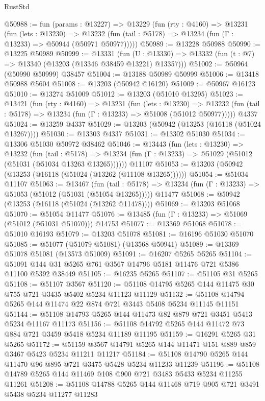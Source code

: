 \begin{lexlean}{RustStd}
\begin{coremodule}
@50988 := fun (params : @13227) =>
  @13229
    (fun (rty : @4160) =>
    @13231
      (fun (lets : @13230) =>
      @13232 (fun (tail : @5178) => @13234 (fun (Γ : @13233) => @50944 (@50971 @50977)))))
@50989 := @13228 @50988
@50990 := @13225 @50989
@50999 := @13331
    (fun (U : @13330) => @13332 (fun (t : @7) => @13340 (@13203 (@13346 @38459 @13221) @13357)))
@51002 := @50964 (@50990 @50999) @38457
@51004 := @13188 @50989 @50999
@51006 := @13418 @50988 @5604
@51008 := @13203 (@50942 @16120)
@51009 := @50967 @16123
@51010 := @13274 @51009
@51012 := @13203 (@51010 @13295)
@51023 := @13421
    (fun (rty : @4160) =>
    @13231
      (fun (lets : @13230) =>
      @13232 (fun (tail : @5178) => @13234 (fun (Γ : @13233) => @51008 (@51012 @50977)))))
    @4337
@51024 := @13259 @4337
@51029 := @13203 (@50942 (@13253 (@16118 (@51024 @13267))))
@51030 := @13303 @4337
@51031 := @13302 @51030
@51034 := @13306 @51030 @50972 @38462
@51046 := @13443
    (fun (lets : @13230) =>
    @13232
      (fun (tail : @5178) =>
      @13234 (fun (Γ : @13233) => @51029 (@51012 (@51031 (@51034 @13263 @13265))))))
    @11107
@51053 := @13203 (@50942 (@13253 (@16118 (@51024 (@13262 (@11108 @13265))))))
@51054 := @51034 @11107
@51063 := @13467
    (fun (tail : @5178) => @13234 (fun (Γ : @13233) => @51053 (@51012 (@51031 (@51054 @13265)))))
    @11477
@51068 := @50942 (@13253 (@16118 (@51024 (@13262 @11478))))
@51069 := @13203 @51068
@51070 := @51054 @11477
@51076 := @13485 (fun (Γ : @13233) => @51069 (@51012 (@51031 @51070))) @14753
@51077 := @13369 @51068
@51078 := @51010 @16193
@51079 := @13203 @51078
@51081 := @16196 @51030 @51070
@51085 := @51077 (@51079 @51081) (@13568 @50941)
@51089 := @13369 @51078 @51081 (@13573 @51009)
@51091 := @16207 @5265 @5265
@51104 := @51091 @144 @31 @5265 @761 @3567 @14796 @5181 @11476 @721 @5386 @11100 @5392 @38449
@51105 := @16235 @5265
@51107 := @51105 @31 @5265
@51108 := @51107 @3567
@51120 := @51108 @14795 @5265 @144 @11475 @30 @755 @721 @3435 @5402 @5234 @11123 @11129
@51132 := @51108 @14794 @5265 @144 @11474 @22 @874 @721 @3443 @5408 @5234 @11145 @11151
@51144 := @51108 @14793 @5265 @144 @11473 @82 @879 @721 @3451 @5413 @5234 @11167 @11173
@51156 := @51108 @14792 @5265 @144 @11472 @73 @884 @721 @3459 @5418 @5234 @11189 @11195
@51159 := @16291 @5265 @31 @5265
@51172 := @51159 @3567 @14791 @5265 @144 @11471 @151 @889 @859 @3467 @5423 @5234 @11211 @11217
@51184 := @51108 @14790 @5265 @144 @11470 @96 @895 @721 @3475 @5428 @5234 @11233 @11239
@51196 := @51108 @14789 @5265 @144 @11469 @108 @900 @721 @3483 @5433 @5234 @11255 @11261
@51208 := @51108 @14788 @5265 @144 @11468 @719 @905 @721 @3491 @5438 @5234 @11277 @11283

\end{coremodule}
\end{lexlean}

